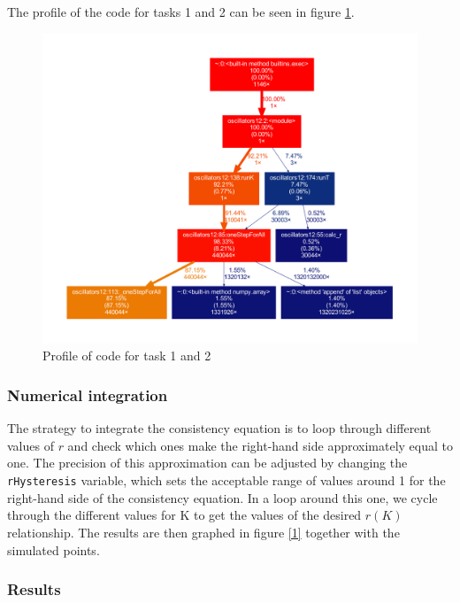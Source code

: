 \documentclass[11pt,a4paper]{article}
\newcommand{\graph}{\medskip\noindent}
\newcommand{\code}[1]{\texttt{#1}}
\begin{document}
\graph
The profile of the code for tasks 1 and 2 can be seen in figure \ref{profile12}.
\begin{figure}[p]
	\centering
	\includegraphics[width=\textwidth]{graphics/profile12.pdf}
	\caption{Profile of code for task 1 and 2}
	\label{profile12}
\end{figure}









\subsubsection{Numerical integration}
The strategy to integrate the consistency equation is to loop through different values of $r$ and check which ones make the right-hand side approximately equal to one. 
The precision of this approximation can be adjusted by changing the \code{rHysteresis} variable, which sets the acceptable range of values around 1 for the right-hand side of the consistency equation.
In a loop around this one, we cycle through the different values for K to get the values of the desired $r(K)$ relationship. 
The results are then graphed in figure \ref{1} together with the simulated points.




\subsubsection{Results}
\end{document}

